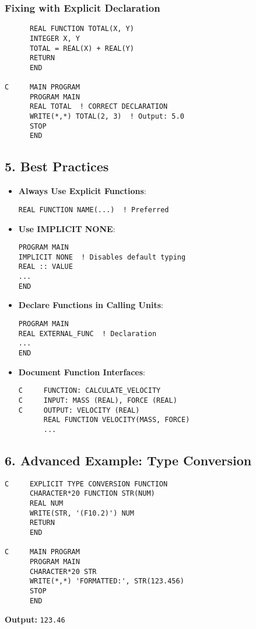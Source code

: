 \documentclass{book}
\begin{document}
\subsubsection*{Fixing with Explicit Declaration}
\begin{verbatim}
      REAL FUNCTION TOTAL(X, Y)
      INTEGER X, Y
      TOTAL = REAL(X) + REAL(Y)
      RETURN
      END

C     MAIN PROGRAM
      PROGRAM MAIN
      REAL TOTAL  ! CORRECT DECLARATION
      WRITE(*,*) TOTAL(2, 3)  ! Output: 5.0
      STOP
      END
\end{verbatim}

\subsection*{5. Best Practices}
\begin{itemize}
\item \textbf{Always Use Explicit Functions}:
\begin{verbatim}
REAL FUNCTION NAME(...)  ! Preferred
\end{verbatim}

\item \textbf{Use IMPLICIT NONE}:
\begin{verbatim}
PROGRAM MAIN
IMPLICIT NONE  ! Disables default typing
REAL :: VALUE
...
END
\end{verbatim}

\item \textbf{Declare Functions in Calling Units}:
\begin{verbatim}
PROGRAM MAIN
REAL EXTERNAL_FUNC  ! Declaration
...
END
\end{verbatim}

\item \textbf{Document Function Interfaces}:
\begin{verbatim}
C     FUNCTION: CALCULATE_VELOCITY
C     INPUT: MASS (REAL), FORCE (REAL)
C     OUTPUT: VELOCITY (REAL)
      REAL FUNCTION VELOCITY(MASS, FORCE)
      ...
\end{verbatim}
\end{itemize}

\subsection*{6. Advanced Example: Type Conversion}
\begin{verbatim}
C     EXPLICIT TYPE CONVERSION FUNCTION
      CHARACTER*20 FUNCTION STR(NUM)
      REAL NUM
      WRITE(STR, '(F10.2)') NUM
      RETURN
      END

C     MAIN PROGRAM
      PROGRAM MAIN
      CHARACTER*20 STR
      WRITE(*,*) 'FORMATTED:', STR(123.456)
      STOP
      END
\end{verbatim}
\textbf{Output:} \texttt{123.46}
\end{document}
